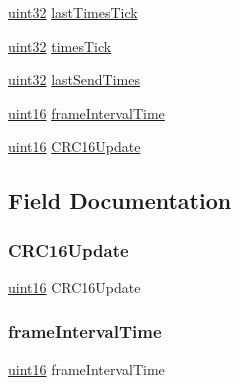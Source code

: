 \begin{DoxyCompactItemize}
\item 
\mbox{\hyperlink{_m_d___r_t_u___type_8h_a1134b580f8da4de94ca6b1de4d37975e}{uint32}} \mbox{\hyperlink{struct_p_modbus_s___r_t_u_a9d80774322e62ae4852d1be4209f6e64}{last\+Times\+Tick}}
\item 
\mbox{\hyperlink{_m_d___r_t_u___type_8h_a1134b580f8da4de94ca6b1de4d37975e}{uint32}} \mbox{\hyperlink{struct_p_modbus_s___r_t_u_a0148764b78c9ff76c2105964bf00daa7}{times\+Tick}}
\item 
\mbox{\hyperlink{_m_d___r_t_u___type_8h_a1134b580f8da4de94ca6b1de4d37975e}{uint32}} \mbox{\hyperlink{struct_p_modbus_s___r_t_u_a41d608ada28d0dab9da40ab127e02a00}{last\+Send\+Times}}
\item 
\mbox{\hyperlink{_m_d___r_t_u___type_8h_a05f6b0ae8f6a6e135b0e290c25fe0e4e}{uint16}} \mbox{\hyperlink{struct_p_modbus_s___r_t_u_ad36ceaf94794d06873de645cee2d87fd}{frame\+Interval\+Time}}
\item 
\mbox{\hyperlink{_m_d___r_t_u___type_8h_a05f6b0ae8f6a6e135b0e290c25fe0e4e}{uint16}} \mbox{\hyperlink{struct_p_modbus_s___r_t_u_a761d5275041fb82bed5aba0c7d1c7fb4}{C\+R\+C16\+Update}}
\end{DoxyCompactItemize}


\subsection{Field Documentation}
\mbox{\label{struct_p_modbus_s___r_t_u_a761d5275041fb82bed5aba0c7d1c7fb4}} 
\subsubsection{\texorpdfstring{C\+R\+C16\+Update}{CRC16Update}}
{\footnotesize\ttfamily \mbox{\hyperlink{_m_d___r_t_u___type_8h_a05f6b0ae8f6a6e135b0e290c25fe0e4e}{uint16}} C\+R\+C16\+Update}

\mbox{\label{struct_p_modbus_s___r_t_u_ad36ceaf94794d06873de645cee2d87fd}} 
\subsubsection{\texorpdfstring{frame\+Interval\+Time}{frameIntervalTime}}
{\footnotesize\ttfamily \mbox{\hyperlink{_m_d___r_t_u___type_8h_a05f6b0ae8f6a6e135b0e290c25fe0e4e}{uint16}} frame\+Interval\+Time}

